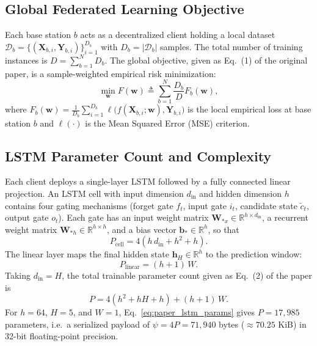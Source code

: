 \documentclass[11pt,a4paper]{article}
\begin{document}
\subsection{Global Federated Learning Objective}
Each base station $b$ acts as a decentralized client holding a local dataset $\mathcal{D}_b = \{(\mathbf{X}_{b,i}, \mathbf{Y}_{b,i})\}_{i=1}^{D_b}$ with $D_b = |\mathcal{D}_b|$ samples. The total number of training instances is $D = \sum_{b=1}^N D_b$. The global objective, given as Eq.~(1) of the original paper, is a sample-weighted empirical risk minimization:
\begin{equation}
    \min_{\mathbf{w}} F(\mathbf{w}) \triangleq \sum_{b=1}^N \frac{D_b}{D} F_b(\mathbf{w}),
    \label{eq:global_obj}
\end{equation}
where $F_b(\mathbf{w}) = \frac{1}{D_b} \sum_{i=1}^{D_b} \ell\big(f(\mathbf{X}_{b,i}; \mathbf{w}), \mathbf{Y}_{b,i}\big)$ is the local empirical loss at base station $b$ and $\ell(\cdot)$ is the Mean Squared Error (MSE) criterion.

\subsection{LSTM Parameter Count and Complexity}
Each client deploys a single-layer LSTM followed by a fully connected linear projection. An LSTM cell with input dimension $d_{\text{in}}$ and hidden dimension $h$ contains four gating mechanisms (forget gate $f_t$, input gate $i_t$, candidate state $\tilde{c}_t$, output gate $o_t$). Each gate has an input weight matrix $\mathbf{W}_{*x} \in \mathbb{R}^{h \times d_{\text{in}}}$, a recurrent weight matrix $\mathbf{W}_{*h} \in \mathbb{R}^{h \times h}$, and a bias vector $\mathbf{b}_* \in \mathbb{R}^h$, so that
\begin{equation}
    P_{\text{cell}} = 4 \left( h \, d_{\text{in}} + h^2 + h \right).
\end{equation}
The linear layer maps the final hidden state $\mathbf{h}_H \in \mathbb{R}^h$ to the prediction window:
\begin{equation}
    P_{\text{linear}} = (h + 1)\, W.
\end{equation}
Taking $d_{\text{in}} = H$, the total trainable parameter count given as Eq.~(2) of the paper is
\begin{equation}
    P = 4 \left( h^2 + h H + h \right) + (h + 1)\, W.
    \label{eq:paper_lstm_params}
\end{equation}
For $h = 64$, $H = 5$, and $W = 1$, Eq.~\eqref{eq:paper_lstm_params} gives $P = 17{,}985$ parameters, i.e.\ a serialized payload of $\psi = 4P = 71{,}940$ bytes ($\approx 70.25$ KiB) in 32-bit floating-point precision.
\end{document}
